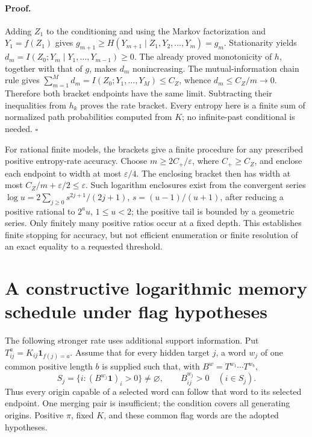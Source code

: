 \paragraph{Proof.}
Adding \(Z_1\) to the conditioning and using the Markov factorization
and \(Y_1=f(Z_1)\) gives
\(g_{m+1}\geq H(Y_{m+1}\mid Z_1,Y_2,\ldots,Y_m)=g_m\).
Stationarity yields
\(d_m=I(Z_0;Y_m\mid Y_1,\ldots,Y_{m-1})\geq0\).
The already proved monotonicity of \(h\), together with that of \(g\),
makes \(d_m\) nonincreasing. The mutual-information chain rule gives
\(\sum_{m=1}^M d_m=I(Z_0;Y_1,\ldots,Y_M)\leq C_Z\), whence
\(d_m\leq C_Z/m\to0\). Therefore both bracket endpoints have the
same limit. Subtracting their inequalities from \(h_k\) proves the rate
bracket. Every entropy here is a finite sum of normalized path probabilities
computed from \(K\); no infinite-past conditional is needed.
\(\square\)

For rational finite models, the brackets give a finite procedure for any
prescribed positive entropy-rate accuracy. Choose
\(m\geq2C_+/\varepsilon\), where \(C_+\geq C_Z\), and enclose each
endpoint to width at most \(\varepsilon/4\). The enclosing bracket then
has width at most \(C_Z/m+\varepsilon/2\leq\varepsilon\).
Such logarithm enclosures exist from the convergent series
\(\log u=2\sum_{j\geq0}s^{2j+1}/(2j+1)\),
\(s=(u-1)/(u+1)\), after reducing a positive rational to
\(2^a u\), \(1\leq u<2\); the positive tail is bounded by a geometric
series. Only finitely many positive ratios occur at a fixed depth. This
establishes finite stopping for accuracy, but not efficient enumeration or
finite resolution of an exact equality to a requested threshold.

\section{A constructive logarithmic memory schedule under flag hypotheses}
\label{sec:rg-memory-flags}

The following stronger rate uses additional support information. Put
\(T^a_{ij}=K_{ij}\mathbf1_{f(j)=a}\). Assume that for every hidden
target \(j\), a word \(w_j\) of one common positive length \(b\) is
supplied such that, with \(B^w=T^{w_1}\cdots T^{w_b}\),
\begin{equation}
 S_j=\{i:(B^{w_j}\mathbf1)_i>0\}\ne\varnothing,
 \qquad B^{w_j}_{ij}>0\quad(i\in S_j).
\label{eq:rg-memory-flag-hypothesis}
\end{equation}
Thus every origin capable of a selected word can follow that word to its
selected endpoint. One merging pair is insufficient; the condition covers
all generating origins. Positive \(\pi\), fixed \(K\), and these
common flag words are the adopted hypotheses. 

